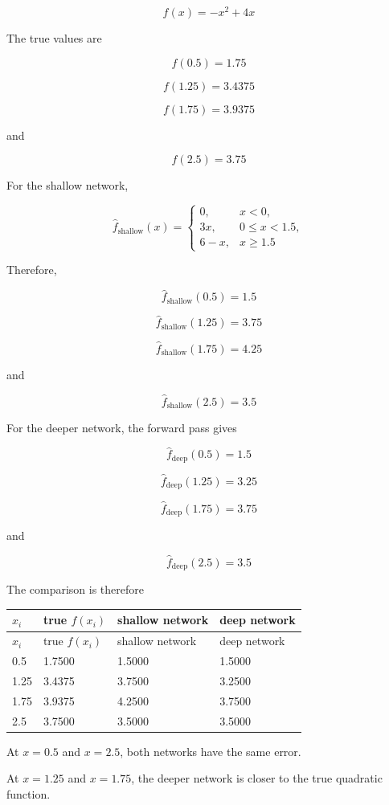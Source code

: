 \documentclass[10pt]{article}
\begin{document}
\[
f(x)=-x^2+4x
\]

The true values are

\[
f(0.5)=1.75
\]

\[
f(1.25)=3.4375
\]

\[
f(1.75)=3.9375
\]

and

\[
f(2.5)=3.75
\]

For the shallow network,

\[
\hat f_{\mathrm{shallow}}(x)=
\begin{cases}
0, & x<0,\\
3x, & 0\leq x<1.5,\\
6-x, & x\geq1.5
\end{cases}
\]

Therefore,

\[
\hat f_{\mathrm{shallow}}(0.5)=1.5
\]

\[
\hat f_{\mathrm{shallow}}(1.25)=3.75
\]

\[
\hat f_{\mathrm{shallow}}(1.75)=4.25
\]

and

\[
\hat f_{\mathrm{shallow}}(2.5)=3.5
\]

For the deeper network, the forward pass gives

\[
\hat f_{\mathrm{deep}}(0.5)=1.5
\]

\[
\hat f_{\mathrm{deep}}(1.25)=3.25
\]

\[
\hat f_{\mathrm{deep}}(1.75)=3.75
\]

and

\[
\hat f_{\mathrm{deep}}(2.5)=3.5
\]

The comparison is therefore

\begingroup
\small
\setlength{\tabcolsep}{4pt}
\begin{longtable}{l|l|l|l}
$x_i$ & true $f(x_i)$ & shallow network & deep network \\[1.5pt]
\hline
\endfirsthead
$x_i$ & true $f(x_i)$ & shallow network & deep network \\[1.5pt]
\hline
\endhead
0.5 & 1.7500 & 1.5000 & 1.5000 \\[1.5pt]
1.25 & 3.4375 & 3.7500 & 3.2500 \\[1.5pt]
1.75 & 3.9375 & 4.2500 & 3.7500 \\[1.5pt]
2.5 & 3.7500 & 3.5000 & 3.5000 \\[1.5pt]
\end{longtable}
\endgroup
At $x=0.5$ and $x=2.5$, both networks have the same error.

At $x=1.25$ and $x=1.75$, the deeper network is closer to the true quadratic function.
\end{document}
